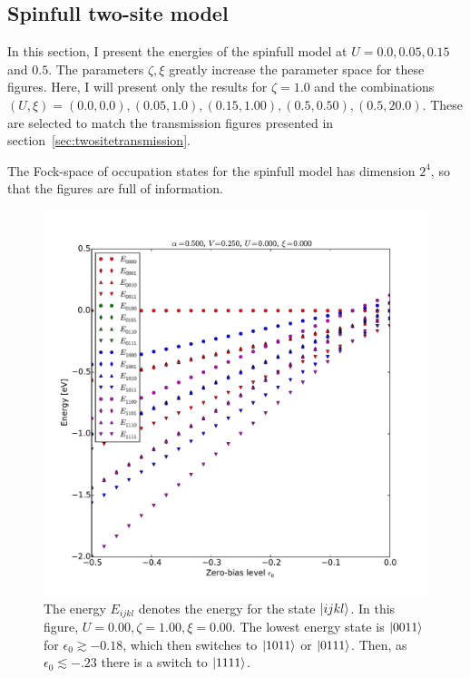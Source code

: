 \subsection{Spinfull two-site model} 
In this section, I present the energies of the spinfull model at $U=0.0, 0.05, 0.15$ and $0.5$. The parameters $\zeta,\xi$ greatly increase the parameter space for these figures. Here, I will present only the results for $\zeta=1.0$ and the combinations $(U, \xi) = (0.0, 0.0), (0.05, 1.0), (0.15, 1.00), (0.5, 0.50), (0.5, 20.0)$. These are selected to match the transmission figures presented in section~\ref{sec:twositetransmission}.

The Fock-space of occupation states for the spinfull model has dimension $2^4$, so that the figures are full of information. 
\begin{figure}[!bt]
    \centering
    \includegraphics[height=.45\textheight]{pdf/energy/pespin_distribution_u0_k0.pdf}
    \caption{The energy $E_{ijkl}$ denotes the energy for the state $\ket{ijkl}$. In this figure, $U=0.00, \zeta=1.00, \xi=0.00$. The lowest energy state is $\ket{0011}$ for $\epsilon_0\gtrsim -0.18$, which then switches to $\ket{1011}$ or $\ket{0111}$. Then, as $\epsilon_0 \lesssim -.23$ there is a switch to $\ket{1111}$.}
    \label{fig:perspinenergy00}
\end{figure} 
